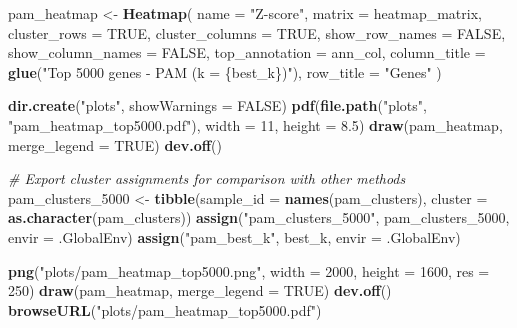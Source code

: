 \documentclass[
]{article}
\newenvironment{Shaded}{\begin{snugshade}}{\end{snugshade}}
\newcommand{\AttributeTok}[1]{\textcolor[rgb]{0.13,0.29,0.53}{#1}}
\newcommand{\CommentTok}[1]{\textcolor[rgb]{0.56,0.35,0.01}{\textit{#1}}}
\newcommand{\ConstantTok}[1]{\textcolor[rgb]{0.56,0.35,0.01}{#1}}
\newcommand{\DecValTok}[1]{\textcolor[rgb]{0.00,0.00,0.81}{#1}}
\newcommand{\FloatTok}[1]{\textcolor[rgb]{0.00,0.00,0.81}{#1}}
\newcommand{\FunctionTok}[1]{\textcolor[rgb]{0.13,0.29,0.53}{\textbf{#1}}}
\newcommand{\NormalTok}[1]{#1}
\newcommand{\OtherTok}[1]{\textcolor[rgb]{0.56,0.35,0.01}{#1}}
\newcommand{\StringTok}[1]{\textcolor[rgb]{0.31,0.60,0.02}{#1}}
\begin{document}
\begin{Shaded}
\begin{Highlighting}[]
\NormalTok{pam\_heatmap }\OtherTok{\textless{}{-}} \FunctionTok{Heatmap}\NormalTok{(}
  \AttributeTok{name =} \StringTok{"Z{-}score"}\NormalTok{,}
  \AttributeTok{matrix =}\NormalTok{ heatmap\_matrix,}
  \AttributeTok{cluster\_rows =} \ConstantTok{TRUE}\NormalTok{,}
  \AttributeTok{cluster\_columns =} \ConstantTok{TRUE}\NormalTok{,}
  \AttributeTok{show\_row\_names =} \ConstantTok{FALSE}\NormalTok{,}
  \AttributeTok{show\_column\_names =} \ConstantTok{FALSE}\NormalTok{,}
  \AttributeTok{top\_annotation =}\NormalTok{ ann\_col,}
  \AttributeTok{column\_title =} \FunctionTok{glue}\NormalTok{(}\StringTok{"Top 5000 genes {-} PAM (k = \{best\_k\})"}\NormalTok{),}
  \AttributeTok{row\_title =} \StringTok{"Genes"}
\NormalTok{)}

\FunctionTok{dir.create}\NormalTok{(}\StringTok{"plots"}\NormalTok{, }\AttributeTok{showWarnings =} \ConstantTok{FALSE}\NormalTok{)}
\FunctionTok{pdf}\NormalTok{(}\FunctionTok{file.path}\NormalTok{(}\StringTok{"plots"}\NormalTok{, }\StringTok{"pam\_heatmap\_top5000.pdf"}\NormalTok{), }\AttributeTok{width =} \DecValTok{11}\NormalTok{, }\AttributeTok{height =} \FloatTok{8.5}\NormalTok{)}
\FunctionTok{draw}\NormalTok{(pam\_heatmap, }\AttributeTok{merge\_legend =} \ConstantTok{TRUE}\NormalTok{)}
\FunctionTok{dev.off}\NormalTok{()}

\CommentTok{\# Export cluster assignments for comparison with other methods}
\NormalTok{pam\_clusters\_5000 }\OtherTok{\textless{}{-}} \FunctionTok{tibble}\NormalTok{(}\AttributeTok{sample\_id =} \FunctionTok{names}\NormalTok{(pam\_clusters), }\AttributeTok{cluster =} \FunctionTok{as.character}\NormalTok{(pam\_clusters))}
\FunctionTok{assign}\NormalTok{(}\StringTok{"pam\_clusters\_5000"}\NormalTok{, pam\_clusters\_5000, }\AttributeTok{envir =}\NormalTok{ .GlobalEnv)}
\FunctionTok{assign}\NormalTok{(}\StringTok{"pam\_best\_k"}\NormalTok{, best\_k, }\AttributeTok{envir =}\NormalTok{ .GlobalEnv)}

\FunctionTok{png}\NormalTok{(}\StringTok{"plots/pam\_heatmap\_top5000.png"}\NormalTok{, }\AttributeTok{width =} \DecValTok{2000}\NormalTok{, }\AttributeTok{height =} \DecValTok{1600}\NormalTok{, }\AttributeTok{res =} \DecValTok{250}\NormalTok{)}
\FunctionTok{draw}\NormalTok{(pam\_heatmap, }\AttributeTok{merge\_legend =} \ConstantTok{TRUE}\NormalTok{)}
\FunctionTok{dev.off}\NormalTok{()}
\FunctionTok{browseURL}\NormalTok{(}\StringTok{"plots/pam\_heatmap\_top5000.pdf"}\NormalTok{)}
\end{Highlighting}
\end{Shaded}
\end{document}
